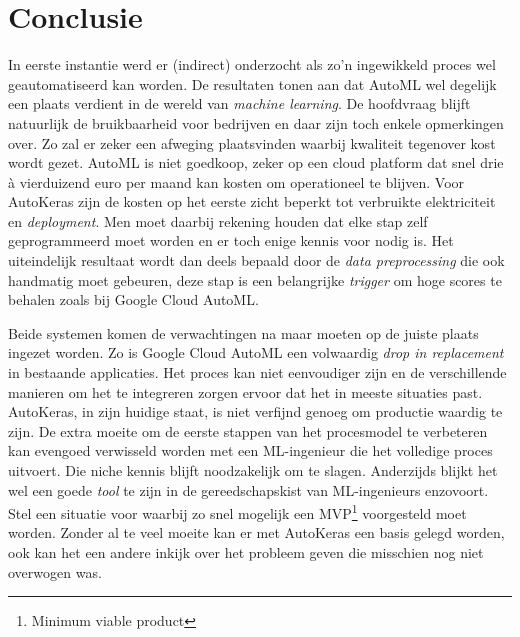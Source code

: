 
\chapter{Conclusie}
\label{ch:conclusie}


In eerste instantie werd er (indirect) onderzocht als zo'n ingewikkeld proces wel geautomatiseerd kan worden. De resultaten tonen aan dat AutoML wel degelijk een plaats verdient in de wereld van \textit{machine learning}. De hoofdvraag blijft natuurlijk de bruikbaarheid voor bedrijven en daar zijn toch enkele opmerkingen over. Zo zal er zeker een afweging plaatsvinden waarbij kwaliteit tegenover kost wordt gezet. AutoML is niet goedkoop, zeker op een cloud platform dat snel drie à vierduizend euro per maand kan kosten om operationeel te blijven. Voor AutoKeras zijn de kosten op het eerste zicht beperkt tot verbruikte elektriciteit en \textit{deployment}. Men moet daarbij rekening houden dat elke stap zelf geprogrammeerd moet worden en er toch enige kennis voor nodig is. Het uiteindelijk resultaat wordt dan deels bepaald door de \textit{data preprocessing} die ook handmatig moet gebeuren, deze stap is een belangrijke \textit{trigger} om hoge scores te behalen zoals bij Google Cloud AutoML.

Beide systemen komen de verwachtingen na maar moeten op de juiste plaats ingezet worden. Zo is Google Cloud AutoML een volwaardig \textit{drop in replacement} in bestaande applicaties. Het proces kan niet eenvoudiger zijn en de verschillende manieren om het te integreren zorgen ervoor dat het in meeste situaties past. AutoKeras, in zijn huidige staat, is niet verfijnd genoeg om productie waardig te zijn. De extra moeite om de eerste stappen van het procesmodel te verbeteren kan evengoed verwisseld worden met een ML-ingenieur die het volledige proces uitvoert. Die niche kennis blijft noodzakelijk om te slagen. Anderzijds blijkt het wel een goede \textit{tool} te zijn in de gereedschapskist van ML-ingenieurs enzovoort. Stel een situatie voor waarbij zo snel mogelijk een MVP\footnote{Minimum viable product} voorgesteld moet worden. Zonder al te veel moeite kan er met AutoKeras een basis gelegd worden, ook kan het een andere inkijk over het probleem geven die misschien nog niet overwogen was. 

